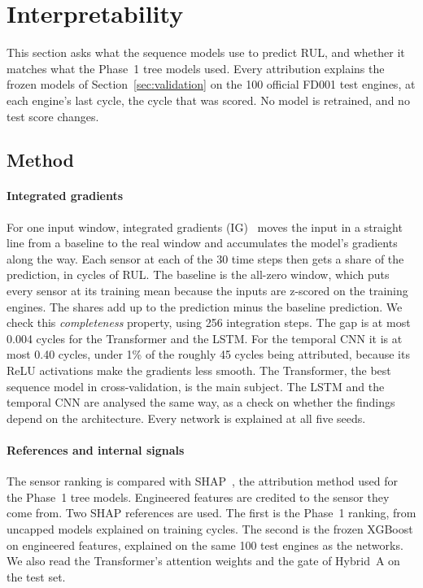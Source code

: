 
\section{Interpretability}
\label{sec:interpretability}

This section asks what the sequence models use to predict RUL, and whether
it matches what the Phase~1 tree models used. Every attribution explains the
frozen models of Section~\ref{sec:validation} on the 100 official FD001 test
engines, at each engine's last cycle, the cycle that was scored. No model is
retrained, and no test score changes.

\subsection{Method}
\paragraph{Integrated gradients}
For one input window, integrated gradients (IG)~\cite{Sundararajan2017axiomatic}
moves the input in a straight line from a baseline to the real window and
accumulates the model's gradients along the way. Each sensor at each of the
30 time steps then gets a share of the prediction, in cycles of RUL. The
baseline is the all-zero window, which puts every sensor at its training
mean because the inputs are z-scored on the training engines. The shares add
up to the prediction minus the baseline prediction. We check this
\emph{completeness} property, using 256 integration steps. The gap is at most
0.004 cycles for the Transformer and the LSTM. For the temporal CNN it is at
most 0.40 cycles, under 1\% of the roughly 45 cycles being attributed, because
its ReLU activations make the gradients less smooth. The Transformer, the best
sequence model in cross-validation, is the main subject. The LSTM and the
temporal CNN are analysed the same way, as a check on whether the findings
depend on the architecture. Every network is explained at all five seeds.

\paragraph{References and internal signals}
The sensor ranking is compared with SHAP~\cite{Lundberg2017unified}, the
attribution method used for the Phase~1 tree models. Engineered features are
credited to the sensor they come from. Two SHAP references are used. The
first is the Phase~1 ranking, from uncapped models explained on training
cycles. The second is the frozen XGBoost on engineered features, explained on
the same 100 test engines as the networks. We also read the Transformer's
attention weights and the gate of Hybrid~A on the test set.

